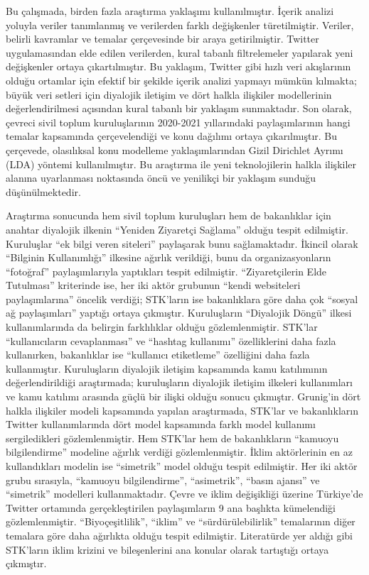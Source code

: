 \documentclass[
]{book}
\begin{document}
Bu çalışmada, birden fazla araştırma yaklaşımı kullanılmıştır. İçerik analizi yoluyla veriler tanımlanmış ve verilerden farklı değişkenler türetilmiştir. Veriler, belirli kavramlar ve temalar çerçevesinde bir araya getirilmiştir. Twitter uygulamasından elde edilen verilerden, kural tabanlı filtrelemeler yapılarak yeni değişkenler ortaya çıkartılmıştır. Bu yaklaşım, Twitter gibi hızlı veri akışlarının olduğu ortamlar için efektif bir şekilde içerik analizi yapmayı mümkün kılmakta; büyük veri setleri için diyalojik iletişim ve dört halkla ilişkiler modellerinin değerlendirilmesi açısından kural tabanlı bir yaklaşım sunmaktadır. Son olarak, çevreci sivil toplum kuruluşlarının 2020-2021 yıllarındaki paylaşımlarının hangi temalar kapsamında çerçevelendiği ve konu dağılımı ortaya çıkarılmıştır. Bu çerçevede, olasılıksal konu modelleme yaklaşımlarından Gizil Dirichlet Ayrımı (LDA) yöntemi kullanılmıştır. Bu araştırma ile yeni teknolojilerin halkla ilişkiler alanına uyarlanması noktasında öncü ve yenilikçi bir yaklaşım sunduğu düşünülmektedir.

Araştırma sonucunda hem sivil toplum kuruluşları hem de bakanlıklar için anahtar diyalojik ilkenin ``Yeniden Ziyaretçi Sağlama'' olduğu tespit edilmiştir. Kuruluşlar ``ek bilgi veren siteleri'' paylaşarak bunu sağlamaktadır. İkincil olarak ``Bilginin Kullanımlığı'' ilkesine ağırlık verildiği, bunu da organizasyonların ``fotoğraf'' paylaşımlarıyla yaptıkları tespit edilmiştir. ``Ziyaretçilerin Elde Tutulması'' kriterinde ise, her iki aktör grubunun ``kendi websiteleri paylaşımlarına'' öncelik verdiği; STK'ların ise bakanlıklara göre daha çok ``sosyal ağ paylaşımları'' yaptığı ortaya çıkmıştır. Kuruluşların ``Diyalojik Döngü'' ilkesi kullanımlarında da belirgin farklılıklar olduğu gözlemlenmiştir. STK'lar ``kullanıcıların cevaplanması'' ve ``hashtag kullanımı'' özelliklerini daha fazla kullanırken, bakanlıklar ise ``kullanıcı etiketleme'' özelliğini daha fazla kullanmıştır. Kuruluşların diyalojik iletişim kapsamında kamu katılımının değerlendirildiği araştırmada; kuruluşların diyalojik iletişim ilkeleri kullanımları ve kamu katılımı arasında güçlü bir ilişki olduğu sonucu çıkmıştır. Grunig'in dört halkla ilişkiler modeli kapsamında yapılan araştırmada, STK'lar ve bakanlıkların Twitter kullanımlarında dört model kapsamında farklı model kullanımı sergiledikleri gözlemlenmiştir. Hem STK'lar hem de bakanlıkların ``kamuoyu bilgilendirme'' modeline ağırlık verdiği gözlemlenmiştir. İklim aktörlerinin en az kullandıkları modelin ise ``simetrik'' model olduğu tespit edilmiştir. Her iki aktör grubu sırasıyla, ``kamuoyu bilgilendirme'', ``asimetrik'', ``basın ajansı'' ve ``simetrik'' modelleri kullanmaktadır. Çevre ve iklim değişikliği üzerine Türkiye'de Twitter ortamında gerçekleştirilen paylaşımların 9 ana başlıkta kümelendiği gözlemlenmiştir. ``Biyoçeşitlilik'', ``iklim'' ve ``sürdürülebilirlik'' temalarının diğer temalara göre daha ağırlıkta olduğu tespit edilmiştir. Literatürde yer aldığı gibi STK'ların iklim krizini ve bileşenlerini ana konular olarak tartıştığı ortaya çıkmıştır.
\end{document}
